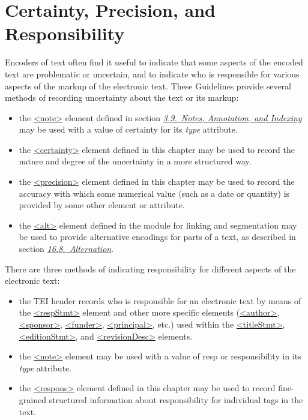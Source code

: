 
\section[{Certainty, Precision, and Responsibility}]{Certainty, Precision, and Responsibility}\label{CE}\par
Encoders of text often find it useful to indicate that some aspects of the encoded text are problematic or uncertain, and to indicate who is responsible for various aspects of the markup of the electronic text. These Guidelines provide several methods of recording uncertainty about the text or its markup: \begin{itemize}
\item the \hyperref[TEI.note]{<note>} element defined in section \textit{\hyperref[CONO]{3.9.\ Notes, Annotation, and Indexing}} may be used with a value of certainty for its {\itshape type} attribute.
\item the \hyperref[TEI.certainty]{<certainty>} element defined in this chapter may be used to record the nature and degree of the uncertainty in a more structured way.
\item the \hyperref[TEI.precision]{<precision>} element defined in this chapter may be used to record the accuracy with which some numerical value (such as a date or quantity) is provided by some other element or attribute.
\item the \hyperref[TEI.alt]{<alt>} element defined in the module for linking and segmentation may be used to provide alternative encodings for parts of a text, as described in section \textit{\hyperref[SAAT]{16.8.\ Alternation}}.
\end{itemize}  There are three methods of indicating responsibility for different aspects of the electronic text: \begin{itemize}
\item the TEI header records who is responsible for an electronic text by means of the \hyperref[TEI.respStmt]{<respStmt>} element and other more specific elements (\hyperref[TEI.author]{<author>}, \hyperref[TEI.sponsor]{<sponsor>}, \hyperref[TEI.funder]{<funder>}, \hyperref[TEI.principal]{<principal>}, etc.) used within the \hyperref[TEI.titleStmt]{<titleStmt>}, \hyperref[TEI.editionStmt]{<editionStmt>}, and \hyperref[TEI.revisionDesc]{<revisionDesc>} elements.
\item the \hyperref[TEI.note]{<note>} element may be used with a value of resp or responsibility in its {\itshape type} attribute.
\item the \hyperref[TEI.respons]{<respons>} element defined in this chapter may be used to record fine-grained structured information about responsibility for individual tags in the text.

\end{itemize}

